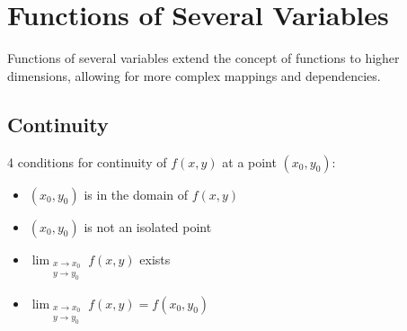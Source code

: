 \chapter{Functions of Several Variables}
Functions of several variables extend the concept of functions to higher dimensions, allowing for more complex mappings and dependencies.

\section{Continuity}

4 conditions for continuity of $f(x, y)$ at a point $(x_0, y_0)$:

\begin{itemize}
    \item $(x_0, y_0)$ is in the domain of $f(x, y)$
    \item $(x_0, y_0)$ is not an isolated point
    \item $\lim_{\substack{x \to x_0\\y \to y_0}} f(x, y)$ exists
    \item $\lim_{\substack{x \to x_0\\y \to y_0}} f(x, y) = f(x_0, y_0)$
\end{itemize}